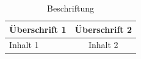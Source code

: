 \begin{table}[H]
  \centering
  \begin{tabular}{l c}
    \toprule
    \textbf{Überschrift 1} & \textbf{Überschrift 2} \\
    \midrule
    Inhalt 1               & Inhalt 2               \\
    \bottomrule
  \end{tabular}
  \caption{Beschriftung}
  \label{tab:tabstd}
\end{table}
